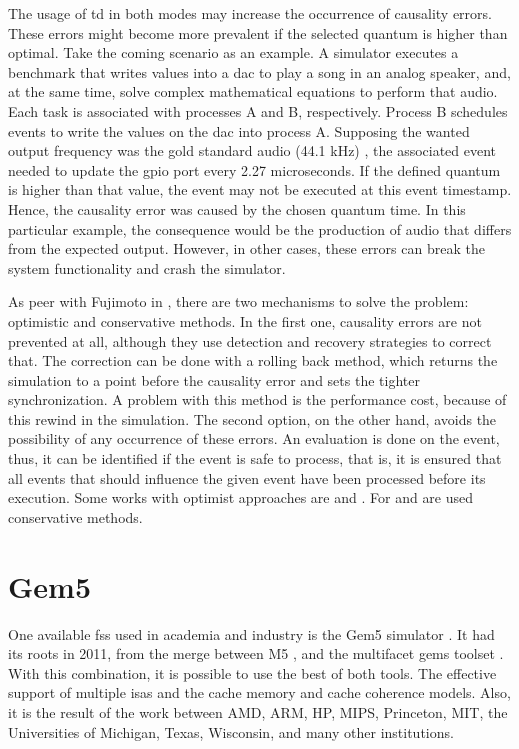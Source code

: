 The usage of \gls{td} in both modes may increase the occurrence of causality errors. These errors might become more prevalent if 
the selected quantum is higher than optimal. Take the coming scenario as an example. A simulator executes a benchmark that writes values into a 
\gls{dac} to play a song in an analog speaker, and, at the same time, solve complex mathematical equations to perform that audio. Each task 
is associated with processes A and B, respectively. Process B schedules events to write the values on the \gls{dac} into process A. Supposing 
the wanted output frequency was the gold standard audio (44.1 kHz) \cite{audio}, the associated event needed to update the \gls{gpio} port 
every 2.27 microseconds. If the defined quantum is higher than that value, the event may not be executed at this event timestamp. Hence, 
the causality error was caused by the chosen quantum time. In this particular example, the consequence would be the production of audio 
that differs from the expected output. However, in other cases, these errors can break the system functionality and crash the simulator. 

As peer with Fujimoto in \cite{PDESfujimoto}, there are two mechanisms to solve the problem: optimistic and conservative methods. In the 
first one, causality errors are not prevented at all, although they use detection and recovery strategies to correct that. The correction can 
be done with a rolling back method, which returns the simulation to a point before the causality error and sets the tighter synchronization. 
A problem with this method is the performance cost, because of this rewind in the simulation. The second option, on the other hand, avoids the 
possibility of any occurrence of these errors. An evaluation is done on the event, thus, it can be identified if the event is safe to process, that 
is, it is ensured that all events that should influence the given event have been processed before its execution. Some works with optimist 
approaches are \cite{busnot2020standard} and \cite{optimist2}. For \cite{dist-gem5} and \cite{asynchronousSimulator} are used conservative methods.

\section{Gem5}

One available \gls{fss} used in academia and industry is the Gem5 simulator \cite{TheGem5Simulator}\cite{Thegem5simulatorV2}. It had its roots 
in 2011, from the merge between M5 \cite{TheM5Simulator}, and the multifacet \gls{gems} toolset \cite{TheGEMS}. 
With this combination, it is possible to use the best of both tools. The effective support of multiple \glspl{isa} and the cache memory 
and cache coherence models. Also, it is the result of the work between AMD, ARM, HP, MIPS, Princeton, MIT, the Universities of Michigan, Texas, 
Wisconsin, and many other institutions.

